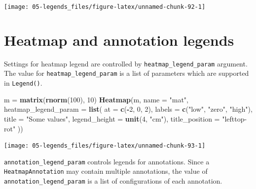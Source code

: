 \documentclass[]{book}
\newenvironment{Shaded}{\begin{snugshade}}{\end{snugshade}}
\newcommand{\KeywordTok}[1]{\textcolor[rgb]{0.13,0.29,0.53}{\textbf{#1}}}
\newcommand{\DataTypeTok}[1]{\textcolor[rgb]{0.13,0.29,0.53}{#1}}
\newcommand{\DecValTok}[1]{\textcolor[rgb]{0.00,0.00,0.81}{#1}}
\newcommand{\StringTok}[1]{\textcolor[rgb]{0.31,0.60,0.02}{#1}}
\newcommand{\OperatorTok}[1]{\textcolor[rgb]{0.81,0.36,0.00}{\textbf{#1}}}
\newcommand{\NormalTok}[1]{#1}
\theoremstyle{definition}
\theoremstyle{definition}
\theoremstyle{definition}
\theoremstyle{remark}
\begin{document}
\begin{center}\texttt{[image: 05-legends\_files/figure-latex/unnamed-chunk-92-1]} \end{center}

\section{Heatmap and annotation
legends}\label{heatmap-and-annotation-legends}

Settings for heatmap legend are controlled by
\texttt{heatmap\_legend\_param} argument. The value for
\texttt{heatmap\_legend\_param} is a list of parameters which are
supported in \texttt{Legend()}.

\begin{Shaded}
\begin{Highlighting}[]
\NormalTok{m =}\StringTok{ }\KeywordTok{matrix}\NormalTok{(}\KeywordTok{rnorm}\NormalTok{(}\DecValTok{100}\NormalTok{), }\DecValTok{10}\NormalTok{)}
\KeywordTok{Heatmap}\NormalTok{(m, }\DataTypeTok{name =} \StringTok{"mat"}\NormalTok{, }\DataTypeTok{heatmap_legend_param =} \KeywordTok{list}\NormalTok{(}
    \DataTypeTok{at =} \KeywordTok{c}\NormalTok{(}\OperatorTok{-}\DecValTok{2}\NormalTok{, }\DecValTok{0}\NormalTok{, }\DecValTok{2}\NormalTok{),}
    \DataTypeTok{labels =} \KeywordTok{c}\NormalTok{(}\StringTok{"low"}\NormalTok{, }\StringTok{"zero"}\NormalTok{, }\StringTok{"high"}\NormalTok{),}
    \DataTypeTok{title =} \StringTok{"Some values"}\NormalTok{,}
    \DataTypeTok{legend_height =} \KeywordTok{unit}\NormalTok{(}\DecValTok{4}\NormalTok{, }\StringTok{"cm"}\NormalTok{),}
    \DataTypeTok{title_position =} \StringTok{"lefttop-rot"}
\NormalTok{))}
\end{Highlighting}
\end{Shaded}

\begin{center}\texttt{[image: 05-legends\_files/figure-latex/unnamed-chunk-93-1]} \end{center}

\texttt{annotation\_legend\_param} controls legends for annotations.
Since a \texttt{HeatmapAnnotation} may contain multiple annotations, the
value of \texttt{annotation\_legend\_param} is a list of configurations
of each annotation.
\end{document}
